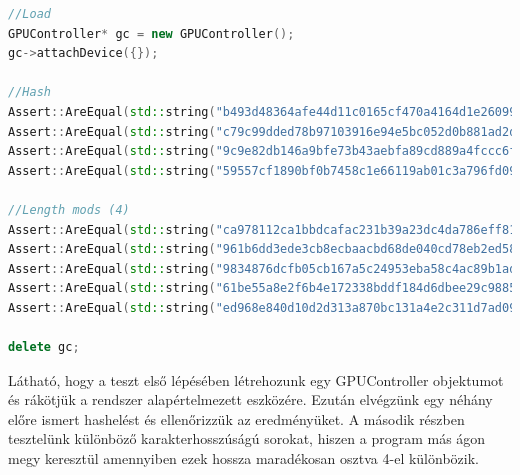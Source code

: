 \begin{lstlisting}[language={C++}]
//Load
GPUController* gc = new GPUController();
gc->attachDevice({});

//Hash
Assert::AreEqual(std::string("b493d48364afe44d11c0165cf470a4164d1e2609911ef998be868d46ade3de4e"), gc->hashSingle("banana"));
Assert::AreEqual(std::string("c79c99dded78b97103916e94e5bc052d0b881ad2da896674b177bda1b1830e35"), gc->hashSingle("encloses"));
Assert::AreEqual(std::string("9c9e82db146a9bfe73b43aebfa89cd889a4fccc6fe916a66dcd497ecc4c182a2"), gc->hashSingle("enclosesHf45DD"));
Assert::AreEqual(std::string("59557cf1890bf0b7458c1e66119ab01c3a796fd09df296ef7e70745d29934777"), gc->hashSingle("ex-wethouder"));

//Length mods (4)
Assert::AreEqual(std::string("ca978112ca1bbdcafac231b39a23dc4da786eff8147c4e72b9807785afee48bb"), gc->hashSingle("a")); //1
Assert::AreEqual(std::string("961b6dd3ede3cb8ecbaacbd68de040cd78eb2ed5889130cceb4c49268ea4d506"), gc->hashSingle("aa")); //2
Assert::AreEqual(std::string("9834876dcfb05cb167a5c24953eba58c4ac89b1adf57f28f2f9d09af107ee8f0"), gc->hashSingle("aaa")); //3
Assert::AreEqual(std::string("61be55a8e2f6b4e172338bddf184d6dbee29c98853e0a0485ecee7f27b9af0b4"), gc->hashSingle("aaaa")); //0
Assert::AreEqual(std::string("ed968e840d10d2d313a870bc131a4e2c311d7ad09bdf32b3418147221f51a6e2"), gc->hashSingle("aaaaa")); //1

delete gc;
\end{lstlisting}

Látható, hogy a teszt első lépésében létrehozunk egy GPUController objektumot és rákötjük a rendszer alapértelmezett eszközére. Ezután elvégzünk egy néhány előre ismert hashelést és ellenőrizzük az eredményüket. A második részben tesztelünk különböző karakterhosszúságú sorokat, hiszen a program más ágon megy keresztül amennyiben ezek hossza maradékosan osztva 4-el különbözik.

